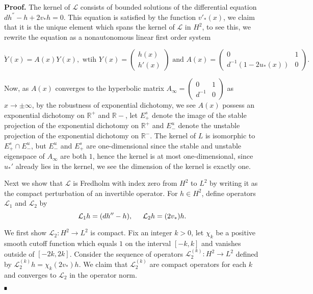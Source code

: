 \documentclass[letterpaper,11pt]{article}
\newcommand{\R}{\mathbb{R}}
\newcommand{\cL}{\mathcal{L}}
\numberwithin{equation}{section}
\theoremstyle{plain}
\theoremstyle{remark}
\newenvironment{Proof}[1][.]%
 {\begin{trivlist}\item[]\textbf{Proof#1 }}%
 {\hspace*{\fill}$\rule{0.3\baselineskip}{0.35\baselineskip}$\end{trivlist}}
\begin{document}
\begin{Proof}
The kernel of $\cL$ consists of bounded solutions of the differential equation $dh^{''}-h+2v_* h = 0$. This equation is satisfied by the function $v'_*(x)$, we claim that it is the unique element which spans the kernel of $\cL$ in $H^2$, to see this, we rewrite the equation as a nonautonomous linear first order system 

\[
\dot{Y}(x) = A(x)Y(x), \text{ wtih }Y(x) = \begin{pmatrix}
h(x)\\
h'(x)
\end{pmatrix} \text{ and } A(x) = \begin{pmatrix}
0&1\\
d^{-1}(1-2u_*(x))&0
\end{pmatrix}.
\]

Now, as $A(x)$ converges to the hyperbolic matrix $A_{\infty}=\begin{pmatrix}
0&1\\
d^{-1}&0
\end{pmatrix}$ as $x \to \pm \infty$, by the robustness of exponential dichotomy, we see $A(x)$ possess an exponential dichotomy on $\R^+$ and $\R-$, let $E_+^s$ denote the image of the stable projection of the exponential dichotomy on $\R^+$ and $E_-^u$ denote the unstable projection of the exponential dichotomy on $\R^-$. The kernel of $L$ is isomorphic to $E_+^s \cap E_-^u$, but $E_-^u$ and $E_+^s$ are one-dimensional since the stable and unstable eigenspace of $A_{\infty}$ are both $1$, hence the kernel is at most one-dimensional, since $u_*'$ already lies in the kernel, we see the dimension of the kernel is exactly one.

Next we show that $\cL$ is Fredholm with index zero from $H^2$ to $L^{2}$ by writing it as the compact perturbation of an invertible operator. For $h \in H^2$, define operators $\cL_1$ and $\cL_2$ by
\[
\cL_1h = (dh''-h), \hspace{0.2in} \cL_2 h = (2v_*)h.
\] 

We first show $\cL_2: H^2 \to L^2$ is compact. Fix an integer $k>0$, let $\chi_k$ be a positive smooth cutoff function which equals $1$ on the interval $[-k,k]$ and vanishes outside of $[-2k,2k]$. Consider the sequence of operators $\cL_2^{(k)} : H^2 \to L^2$ defined by $\cL_2^{(k)} h = \chi_k (2v_*)h$. We claim that $\cL_2^{(k)}$ are compact operators for each $k$ and converges to $\cL_2$ in the operator norm.


\end{Proof}
\end{document}

